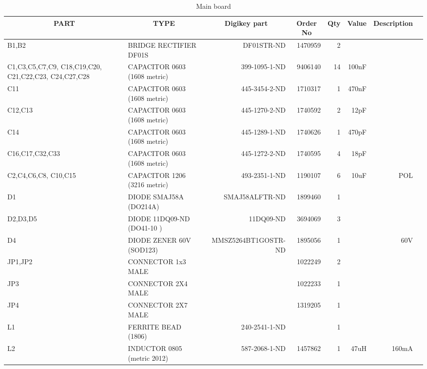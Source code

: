\documentclass[12pt,a4paper,twoside,openright]{book}
\begin{document}
\begin{table}\footnotesize
\label{tab:main_board}
\caption{Main board}
\setlength{\leftmargin}{-1cm}
\begin{tabular*}{0.7\textwidth}{|p{2.8cm}|p{6.3cm}|r|r|r|r|r|c|}
\hline
\multicolumn{1}{|c|}{\textbf{PART}} & \multicolumn{1}{c|}{\textbf{TYPE}} & \multicolumn{1}{c|}{\textbf{Digikey part}} & \multicolumn{1}{c|}{\textbf{Order No}} & \multicolumn{1}{c|}{\textbf{Qty}} & \multicolumn{1}{c|}{\textbf{Value}} & \multicolumn{1}{c|}{\textbf{Description}}\\ \hline
B1,B2 & BRIDGE RECTIFIER DF01S & DF01STR-ND & 1470959 & 2 &  &  \\ \hline
C1,C3,C5,C7,C9,\newline
C18,C19,C20,\newline
C21,C22,C23,\newline
C24,C27,C28 & CAPACITOR 0603 (1608 metric) & 399-1095-1-ND & 9406140 & 14 & 100nF &   \\ \hline
C11 & CAPACITOR 0603 (1608 metric) & 445-3454-2-ND & 1710317 & 1 & 470nF &   \\ \hline
C12,C13 & CAPACITOR 0603 (1608 metric) & 445-1270-2-ND & 1740592 & 2 & 12pF &  \\ \hline
C14 & CAPACITOR 0603 (1608 metric) & 445-1289-1-ND & 1740626 & 1 & 470pF &  \\ \hline
C16,C17,C32,C33 & CAPACITOR 0603 (1608 metric) & 445-1272-2-ND & 1740595 & 4 & 18pF &  \\ \hline
C2,C4,C6,C8,\newline
C10,C15 & CAPACITOR 1206 (3216 metric) & 493-2351-1-ND & 1190107 & 6 & 10uF & POL \\ \hline
D1 & DIODE SMAJ58A (DO214A) & SMAJ58ALFTR-ND & 1899460 & 1 &  &  \\ \hline
D2,D3,D5 & DIODE 11DQ09-ND (DO41-10 ) & 11DQ09-ND & 3694069 & 3 &  &   \\ \hline
D4 & DIODE ZENER 60V (SOD123) & MMSZ5264BT1GOSTR-ND & 1895056 & 1 &  & 60V  \\ \hline
JP1,JP2 & CONNECTOR 1x3 MALE &  & 1022249 & 2 &  &  \\ \hline
JP3 & CONNECTOR 2X4 MALE &  & 1022233 & 1 &  &  \\ \hline
JP4 & CONNECTOR 2X7 MALE &  & 1319205 & 1 &  &   \\ \hline
L1 & FERRITE BEAD (1806) & 240-2541-1-ND &  & 1 &  &  \\ \hline
L2 & INDUCTOR 0805 (metric 2012) & 587-2068-1-ND & 1457862 & 1 & 47uH & 160mA  \\ \hline

\end{tabular*}
\end{table}
\end{document}
